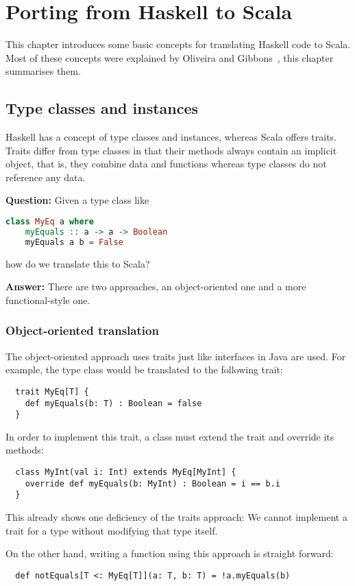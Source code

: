 \chapter{Porting from Haskell to Scala}

This chapter introduces some basic concepts for translating Haskell code
to Scala. Most of these concepts were explained by Oliveira and Gibbons~\cite{scalagp}, this
chapter summarises them.

\section{Type classes and instances}

Haskell has a concept of type classes and instances, whereas Scala offers
traits. Traits differ from type classes in that their methods always contain
an implicit  object, that is, they combine data and functions
whereas type classes do not reference any data.

\textbf{Question:} Given a type class like
\begin{lstlisting}[language=Haskell]
  class MyEq a where
    myEquals :: a -> a -> Boolean
    myEquals a b = False
\end{lstlisting}
how do we translate this to Scala?

\textbf{Answer:} There are two approaches, an object-oriented one and a more
functional-style one.

\subsection{Object-oriented translation}
The object-oriented approach uses traits just like interfaces in
Java are used. For example, the  type class would be translated
to the following trait:
\begin{lstlisting}
  trait MyEq[T] {
    def myEquals(b: T) : Boolean = false
  }
\end{lstlisting}
In order to implement this trait, a class must extend the
trait and override its methods:
\begin{lstlisting}
  class MyInt(val i: Int) extends MyEq[MyInt] {
    override def myEquals(b: MyInt) : Boolean = i == b.i
  }
\end{lstlisting}
This already shows one deficiency of the traits approach: We cannot
implement a trait for a type without modifying that type itself.

On the other hand, writing a function using this approach is straight forward:
\begin{lstlisting}
  def notEquals[T <: MyEq[T]](a: T, b: T) = !a.myEquals(b)
\end{lstlisting}

